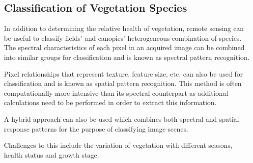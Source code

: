 \subsection{Classification of Vegetation Species}
In addition to determining the relative health of vegetation, remote sensing can be useful to classify fields' and canopies' heterogeneous combination of species.  The spectral characteristics of each pixel in an acquired image can be combined into similar groups for classification and is known as spectral pattern recognition.

Pixel relationships that represent texture, feature size, etc. can also be used for classification and is known as spatial pattern recognition. This method is often computationally more intensive than its spectral counterpart as additional calculations need to be performed in order to extract this information.

A hybrid approach can also be used which combines both spectral and spatial response patterns for the purpose of classifying image scenes.

Challenges to this include the variation of vegetation with different seasons, health status and growth stage.
